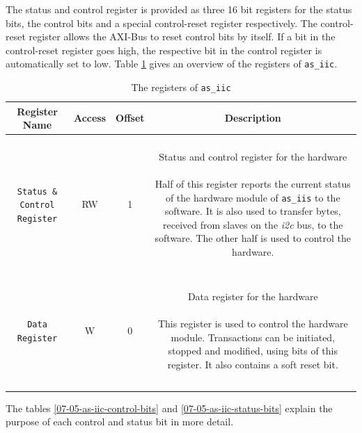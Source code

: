 The status and control register is provided as three 16 bit registers for the status bits, the control bits and a special control-reset register respectively.
The control-reset register allows the AXI-Bus to reset control bits by itself.
If a bit in the control-reset register goes high, the respective bit in the control register is automatically set to low.
Table \ref{07-05-as-iic-registers} gives an overview of the registers of \texttt{as\_iic}.

\begin{longtable}[htb]{|c|c|c|c|}
\hline 
\textbf{Register Name} & \textbf{Access} & \textbf{Offset} & \textbf{Description} \\
\hline
\endhead

\texttt{Status \& Control Register} & RW & 1 &
\parbox{7cm}{ ~ \\ Status and control register for the hardware \\ ~ \\ \small
Half of this register reports the current status of the hardware module of \texttt{as\_iis} to the software. It is also used to transfer bytes, received from slaves on the \textit{i2c} bus, to the software.
The other half is used to control the hardware.
\\ ~ } \\

\hline 

\texttt{Data Register} & W & 0 &
\parbox{7cm}{ ~ \\ Data register for the hardware \\ ~ \\ \small
This register is used to control the hardware module.
Transactions can be initiated, stopped and modified, using bits of this register.
It also contains a soft reset bit.
\\ ~ } \\

\hline 

\caption{The registers of \texttt{as\_iic}}
\label{07-05-as-iic-registers}
\end{longtable}


The tables \ref{07-05-as-iic-control-bits} and \ref{07-05-as-iic-status-bits} explain the purpose of each control and status bit in more detail.


